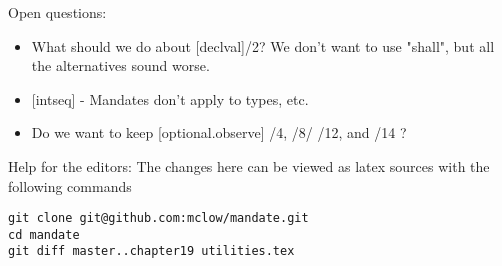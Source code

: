 Open questions:
\begin{itemize}
\item{What should we do about [declval]/2? We don't want to use "shall", but all the alternatives sound worse.}
\item{[intseq] - Mandates don't apply to types, etc.}
\item{Do we want to keep [optional.observe] /4, /8/ /12, and /14 ?}
\end{itemize}

\vfill
Help for the editors: The changes here can be viewed as latex sources with the following commands
\begin{verbatim}
git clone git@github.com:mclow/mandate.git
cd mandate
git diff master..chapter19 utilities.tex
\end{verbatim}
\newpage
